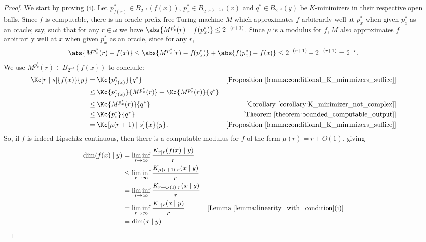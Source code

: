 \begin{proof}
    We start by proving (i). Let $p_{f(x)}^* \in B_{2^{-r}}(f(x))$, $p_x^* \in B_{2^{-\mu(r + 1)}}(x)$ and $q^* \in B_{2^{-s}}(y)$ be $K$-minimizers in their respective open balls. Since $f$ is computable, there is an oracle prefix-free Turing machine $M$ which approximates $f$ arbitrarily well at $p^*_x$ when given $p^*_x$ as an oracle; say, such that for any $r \in \omega$ we have $\abs{M^{p^*_x}(r) - f(p^*_x)} \leq 2^{-(r + 1)}$. Since $\mu$ is a modulus for $f$, $M$ also approximates $f$ arbitrarily well at $x$ when given $p^*_x$ as an oracle, since for any $r$,
    \begin{align*}
        \abs{M^{p^*_x}(r) - f(x)} \leq \abs{M^{p^*_x}(r) - f(p^*_x)} + \abs{f(p^*_x) - f(x)} \leq 2^{-(r + 1)} + 2^{-(r + 1)} = 2^{-r}.
    \end{align*}
    We use $M^{p^*_x}(r) \in B_{2^{-r}}(f(x))$ to conclude:
    \begin{align*}
        \Kc[r \mid s]{f(x)}{y} &= \Kc{p^*_{f(x)}}{q^*} & [\text{Proposition~\ref{lemma:conditional_K_minimizers_suffice}}]\\
        &\leq\Kc{p^*_{f(x)}}{M^{p^*_x}(r)} +  \Kc{M^{p^*_x}(r)}{q^*}\\
        &\leq \Kc{M^{p^*_x}(r)}{q^*} & [\text{Corollary~\ref{corollary:K_minimizer_not_complex}}]\\
        &\leq \Kc{p^*_x}{q^*} & [\text{Theorem~\ref{theorem:bounded_computable_output}}]\\
        &= \Kc[\mu(r + 1) \mid s]{x}{y}. & [\text{Proposition~\ref{lemma:conditional_K_minimizers_suffice}}]
    \end{align*}
    So, if $f$ is indeed Lipschitz continuous, then there is a computable modulus for $f$ of the form $\mu(r) = r + O(1)$, giving
    \begin{align*}
        \dim(f(x) \mid y) &= \liminf_{r \to \infty} \frac{K_{r \mid r}(f(x) \mid y)}{r}\\
        &\leq \liminf_{r \to \infty} \frac{K_{\mu(r + 1) \mid r}(x \mid y)}{r}\\
        &= \liminf_{r \to \infty} \frac{K_{r + O(1) \mid r}(x \mid y)}{r}\\
        &= \liminf_{r \to \infty} \frac{K_{r \mid r}(x \mid y)}{r} & [\text{Lemma~\ref{lemma:linearity_with_condition}(i)}]\\
        &= \dim(x \mid y).
    \end{align*}


\end{proof}
